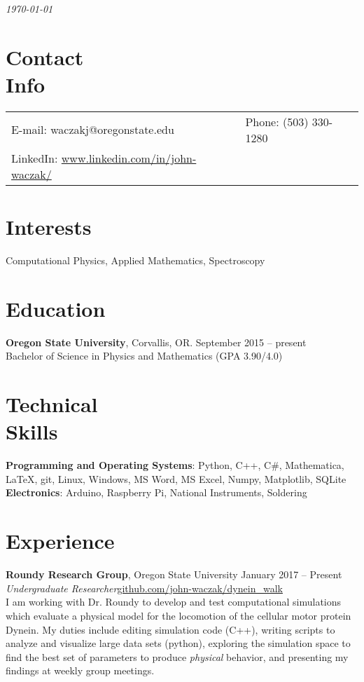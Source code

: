 \documentclass[margin,line, 11pt]{res}
\begin{document}
 \hfill {\em \today}

\begin{resume}
\section{\sc Contact\\ Info}

\vspace{.05in}
\begin{tabular}{@{}p{3.5in}p{3in}}
{E-mail:}  waczakj@oregonstate.edu   & {Phone:}  (503) 330-1280 \\
{LinkedIn:} \scriptsize{ \url{www.linkedin.com/in/john-waczak/}}

\end{tabular}


\section{\sc Interests}

Computational Physics, Applied Mathematics, Spectroscopy

\section{\sc Education}
{\bf Oregon State University}, Corvallis, OR. \hfill September 2015 -- present\\
Bachelor of Science in Physics and Mathematics \hfill(GPA 3.90/4.0)

\section{\sc Technical \\ Skills}
{\bf Programming and Operating Systems}: Python, C++, C\#, Mathematica, \LaTeX, git, Linux, Windows, MS Word, MS Excel, Numpy, Matplotlib, SQLite \\
{\bf Electronics}: Arduino, Raspberry Pi, National Instruments, Soldering
\section{\sc Experience}
{\bf Roundy Research Group}, Oregon State University \hfill{January 2017 -- Present}\\
{\em Undergraduate Researcher}\hfill \scriptsize{\url{github.com/john-waczak/dynein_walk}}\\
I am working with Dr. Roundy to develop and test computational simulations which evaluate a physical model for the locomotion of the cellular motor protein Dynein. My duties include editing simulation code (C++), writing scripts to analyze and visualize large data sets (python), exploring the simulation space to find the best set of parameters to produce \textit{physical} behavior, and presenting my findings at weekly group meetings.


\end{resume}
\end{document}
